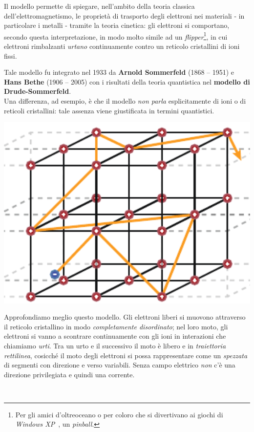 Il modello permette di spiegare, nell'ambito della teoria classica dell'elettromagnetismo, le proprietà di trasporto degli elettroni nei materiali - in particolare i metalli - tramite la teoria cinetica: gli elettroni si comportano, secondo questa interpretazione, in modo molto simile ad un \textit{flipper}\footnote{Per gli amici d'oltreoceano o per coloro che si divertivano ai giochi di \textit{Windows XP}\texttrademark\ , un \textit{pinball}.}, in cui elettroni rimbalzanti \textit{urtano} continuamente contro un reticolo cristallini di ioni fissi.
\begin{digression}
	Tale modello fu integrato nel 1933 da \textbf{Arnold Sommerfeld} (1868 – 1951) e \textbf{Hans Bethe} (1906 – 2005) con i risultati della teoria quantistica nel \textbf{modello di Drude-Sommerfeld}.\\
	Una differenza, ad esempio, è che il modello \textit{non parla} esplicitamente di ioni o di reticoli cristallini: tale assenza viene giustificata in termini quantistici.
\end{digression}
\begin{minipage}{0.38\textwidth}
	\begin{center}
		\includegraphics[width=1\textwidth]{images/chp5/chp5reticolocristallino.pdf}
	\end{center}
\end{minipage}\hspace{5pt}
\begin{minipage}{0.61\textwidth}
	Approfondiamo meglio questo modello. Gli elettroni liberi si muovono attraverso il reticolo cristallino in modo \textit{completamente disordinato}; nel loro moto, gli elettroni si vanno a scontrare continuamente con gli ioni in interazioni che chiamiamo \textit{urti}. Tra un urto e il successivo il moto è libero e in \textit{traiettoria rettilinea}, cosicché il moto degli elettroni si possa rappresentare come un \textit{spezzata} di segmenti con direzione e verso variabili. Senza campo elettrico \textit{non} c'è una direzione privilegiata e quindi una corrente.
\end{minipage}\\

